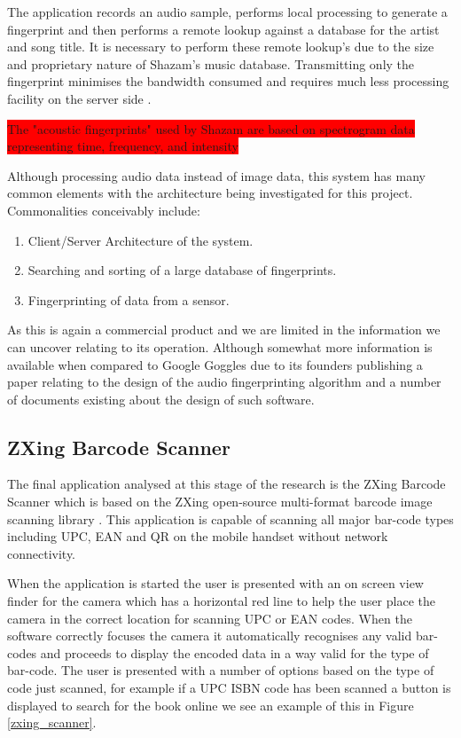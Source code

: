 The application records an audio sample, performs local processing to generate a fingerprint and then performs a remote lookup against a database for the artist and song title. It is necessary to perform these remote lookup’s due to the size and proprietary nature of Shazam’s music database. Transmitting only the fingerprint minimises the bandwidth consumed and requires much less processing facility on the server side \cite{wang03}.

\colorbox{red}{The "acoustic fingerprints" used by Shazam are based on spectrogram data representing time, frequency, and intensity}

Although processing audio data instead of image data, this system has many common elements with the architecture being investigated for this project. Commonalities conceivably include:

\begin{enumerate}
\item Client/Server Architecture of the system.
\item Searching and sorting of a large database of fingerprints.
\item Fingerprinting of data from a sensor.
\end{enumerate}

As this is again a commercial product and we are limited in the information we can uncover relating to its operation. Although somewhat more information is available when compared to Google Goggles due to its founders publishing a paper relating to the design of the audio fingerprinting algorithm and a number of documents existing about the design of such software.

\subsection{ZXing Barcode Scanner}
The final application analysed at this stage of the research is the ZXing Barcode Scanner which is based on the ZXing open-source multi-format barcode image scanning library \cite{zxingproject}. This application is capable of scanning all major bar-code types including UPC, EAN and QR on the mobile handset without network connectivity.

When the application is started the user is presented with an on screen view finder for the camera which has a horizontal red line to help the user place the camera in the correct location for scanning UPC or EAN codes. When the software correctly focuses the camera it automatically recognises any valid bar-codes and proceeds to display the encoded data in a way valid for the type of bar-code. The user is presented with a number of options based on the type of code just scanned, for example if a UPC ISBN code has been scanned a button is displayed to search for the book online we see an example of this in Figure \ref{zxing_scanner}.

